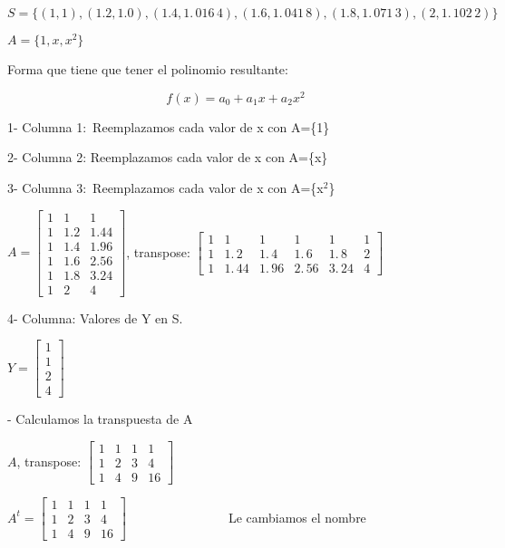 \documentclass{article}
\begin{document}
$S=\{(1,1),(1.2,\allowbreak 1.0),(1.4,\allowbreak 1.\,\allowbreak
016\,4),(1.6,1.\,\allowbreak 041\,8),(1.8,1.\,\allowbreak
071\,3),(2,\allowbreak 1.\,\allowbreak 102\,2)\}$

\bigskip $A=\{1,x,x^{2}\}$

\qquad \qquad Forma que tiene que tener el polinomio resultante:

\[
f(x)=a_{0}+a_{1}x+a_{2}x^{2} 
\]

1- Columna 1:\ Reemplazamos cada valor de x con A=\{1\}

2- Columna 2: Reemplazamos cada valor de x con A=\{x\}

3- Columna 3:\ Reemplazamos cada valor de x con A=\{x$^{2}$\}

$A=\left[ 
\begin{array}{ccc}
1 & 1 & 1 \\ 
1 & 1.2 & 1.44 \\ 
1 & 1.4 & 1.96 \\ 
1 & 1.6 & 2.56 \\ 
1 & 1.8 & 3.24 \\ 
1 & 2 & 4%
\end{array}%
\right] $, transpose: $\left[ 
\begin{array}{cccccc}
1 & 1 & 1 & 1 & 1 & 1 \\ 
1 & 1.\,\allowbreak 2 & 1.\,\allowbreak 4 & 1.\,\allowbreak 6 & 
1.\,\allowbreak 8 & 2 \\ 
1 & 1.\,\allowbreak 44 & 1.\,\allowbreak 96 & 2.\,\allowbreak 56 & 
3.\,\allowbreak 24 & 4%
\end{array}%
\right] \allowbreak $

4- Columna: Valores de Y en S.

$Y=\left[ 
\begin{array}{c}
1 \\ 
1 \\ 
2 \\ 
4%
\end{array}%
\right] $

- Calculamos la transpuesta de A

$A$, transpose: $\left[ 
\begin{array}{cccc}
1 & 1 & 1 & 1 \\ 
1 & 2 & 3 & 4 \\ 
1 & 4 & 9 & 16%
\end{array}%
\right] $

$A^{t}=\left[ 
\begin{array}{cccc}
1 & 1 & 1 & 1 \\ 
1 & 2 & 3 & 4 \\ 
1 & 4 & 9 & 16%
\end{array}%
\right] \qquad \qquad \qquad \qquad $Le cambiamos el nombre
\end{document}

